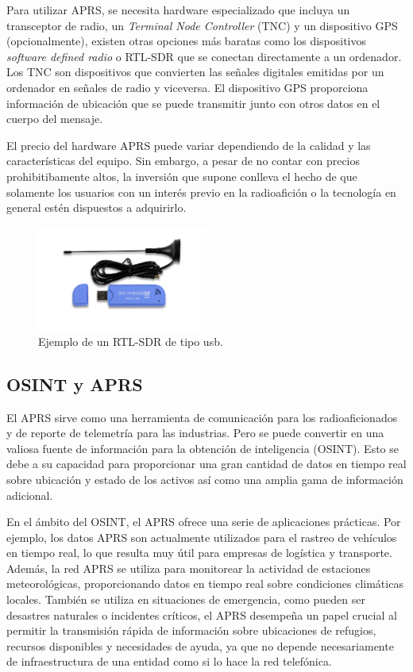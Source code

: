 Para utilizar APRS, se necesita hardware especializado que incluya un transceptor de radio, un \textit{Terminal Node Controller} (TNC) y un dispositivo GPS (opcionalmente), existen otras opciones más baratas como los dispositivos \textit{software defined radio} o RTL-SDR  que se conectan directamente a un ordenador. Los TNC son dispositivos que convierten las señales digitales emitidas por un ordenador en señales de radio y viceversa. El dispositivo GPS proporciona información de ubicación que se puede transmitir junto con otros datos en el cuerpo del mensaje.

El precio del hardware APRS puede variar dependiendo de la calidad y las características del equipo. Sin embargo, a pesar de no contar con precios prohibitibamente altos, la inversión que supone conlleva el hecho de que solamente los usuarios con un interés previo en la radioafición o la tecnología en general estén dispuestos a adquirirlo.

\begin{figure}
    \centering
    \includegraphics[width=0.5\textwidth]{Imagenes/Chapter_2/rtl_sdr.jpg}
    \caption{Ejemplo de un RTL-SDR de tipo usb.}
    \label{fig:rtl-sdr}
\end{figure}


\subsection{OSINT y APRS}

El APRS sirve como una herramienta de comunicación para los radioaficionados y de reporte de telemetría para las industrias. Pero se puede convertir en una valiosa fuente de información para la obtención de inteligencia (OSINT). Esto se debe a su capacidad para proporcionar una gran cantidad de datos en tiempo real sobre ubicación y estado de los activos así como una amplia gama de información adicional.

En el ámbito del OSINT, el APRS ofrece una serie de aplicaciones prácticas. Por ejemplo, los datos APRS son actualmente utilizados para el rastreo de vehículos en tiempo real, lo que resulta muy útil para empresas de logística y transporte. Además, la red APRS se utiliza para monitorear la actividad de estaciones meteorológicas, proporcionando datos en tiempo real sobre condiciones climáticas locales. También se utiliza en situaciones de emergencia, como pueden ser desastres naturales o incidentes críticos, el APRS desempeña un papel crucial al permitir la transmisión rápida de información sobre ubicaciones de refugios, recursos disponibles y necesidades de ayuda, ya que no depende necesariamente de infraestructura de una entidad como si lo hace la red telefónica.

